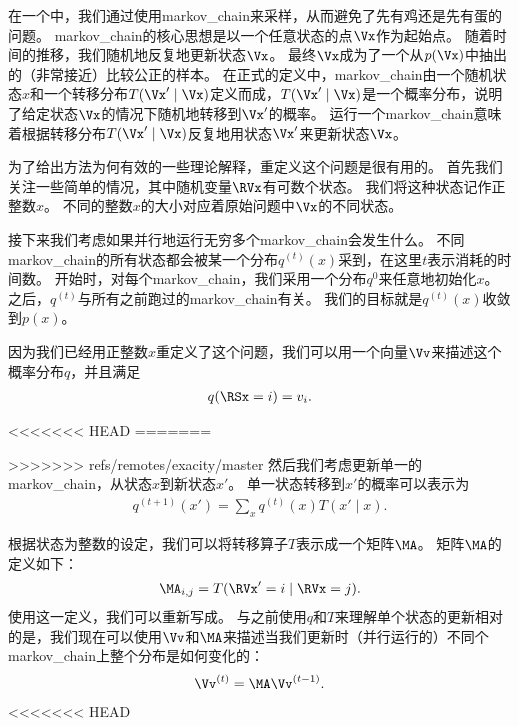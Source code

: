 在一个中，我们通过使用\gls{markov_chain}来采样，从而避免了先有鸡还是先有蛋的问题。
\gls{markov_chain}的核心思想是以一个任意状态的点$\Vx$作为起始点。
随着时间的推移，我们随机地反复地更新状态$\Vx$。
最终$\Vx$成为了一个从$p(\Vx)$中抽出的（非常接近）比较公正的样本。
在正式的定义中，\gls{markov_chain}由一个随机状态$x$和一个转移分布$T(\Vx'\mid \Vx)$定义而成，$T(\Vx'\mid \Vx)$是一个概率分布，说明了给定状态$\Vx$的情况下随机地转移到$\Vx'$的概率。
运行一个\gls{markov_chain}意味着根据转移分布$T(\Vx'\mid \Vx)$反复地用状态$\Vx'$来更新状态$\Vx$。


为了给出方法为何有效的一些理论解释，重定义这个问题是很有用的。
首先我们关注一些简单的情况，其中随机变量$\RVx$有可数个状态。
我们将这种状态记作正整数$x$。
不同的整数$x$的大小对应着原始问题中$\Vx$的不同状态。


接下来我们考虑如果并行地运行无穷多个\gls{markov_chain}会发生什么。
不同\gls{markov_chain}的所有状态都会被某一个分布$q^{(t)}(x)$采到，在这里$t$表示消耗的时间数。
开始时，对每个\gls{markov_chain}，我们采用一个分布$q^{{0}}$来任意地初始化$x$。
之后，$q^{(t)}$与所有之前跑过的\gls{markov_chain}有关。
我们的目标就是$q^{(t)}(x)$收敛到$p(x)$。


因为我们已经用正整数$x$重定义了这个问题，我们可以用一个向量$\Vv$来描述这个概率分布$q$，并且满足
\begin{align}
q(\RSx = i) = v_i.
\end{align}

<<<<<<< HEAD
=======

>>>>>>> refs/remotes/exacity/master
然后我们考虑更新单一的\gls{markov_chain}，从状态$x$到新状态$x'$。
单一状态转移到$x'$的概率可以表示为
\begin{align}
\label{eqn:transition1}
q^{(t+1)}(x') = \sum_{x} q^{(t)}(x) T(x'\mid x).
\end{align}


根据状态为整数的设定，我们可以将转移算子$T$表示成一个矩阵$\MA$。
矩阵$\MA$的定义如下：
\begin{align}
\MA_{i,j} = T(\RVx' = i\mid \RVx = j).
\end{align}
使用这一定义，我们可以重新写成。
与之前使用$q$和$T$来理解单个状态的更新相对的是，我们现在可以使用$\Vv$和$\MA$来描述当我们更新时（并行运行的）不同个\gls{markov_chain}上整个分布是如何变化的：
\begin{align}
\Vv^{(t)} = \MA \Vv^{(t-1)}.
\end{align}
<<<<<<< HEAD

